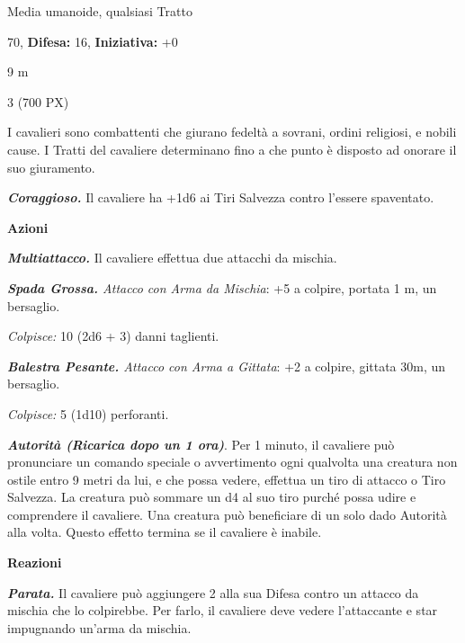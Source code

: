 \begin{multicols}{2}
{
\begin{description}[noitemsep, topsep=0pt, parsep=0pt, partopsep=0pt, leftmargin=0cm, labelwidth=2.2cm]
    \item[\textbf{Taglia/Tipo:}] Media umanoide, qualsiasi Tratto
    \item[\textbf{Caratt.:}] 
    \item[\textbf{Punti Ferita:}] 70,  \textbf{Difesa:} 16,  \textbf{Iniziativa:} +0
    \item[\textbf{Tiri Salvez.:}] 
    \item[\textbf{Movimento:}] 9 m
    \item[\textbf{Sfida:}] 3 (700 PX)\smallskip
\end{description}

I cavalieri sono combattenti che giurano fedeltà a sovrani, ordini religiosi, e nobili cause. I Tratti del cavaliere determinano fino a che punto è disposto ad onorare il suo giuramento.

\emph{\textbf{Coraggioso.}} Il cavaliere ha +1d6 ai Tiri Salvezza contro l'essere spaventato.

\textbf{Azioni}

\emph{\textbf{Multiattacco.}} Il cavaliere effettua due attacchi da mischia.

\emph{\textbf{Spada Grossa.} Attacco con Arma da Mischia}: +5 a colpire, portata 1 m, un bersaglio.

\emph{Colpisce:} 10 (2d6 + 3) danni taglienti.

\emph{\textbf{Balestra Pesante.} Attacco con Arma a Gittata}: +2 a colpire, gittata 30m, un bersaglio.

\emph{Colpisce:} 5 (1d10) perforanti.

\emph{\textbf{Autorità (Ricarica dopo un 1 ora)}}. Per 1 minuto, il cavaliere può pronunciare un comando speciale o avvertimento ogni qualvolta una creatura non ostile entro 9 metri da lui, e che possa vedere, effettua un tiro di attacco o Tiro Salvezza. La creatura può sommare un d4 al suo tiro purché possa udire e comprendere il cavaliere. Una creatura può beneficiare di un solo dado Autorità alla volta. Questo effetto termina se il cavaliere è inabile.

\textbf{Reazioni}

\emph{\textbf{Parata.}} Il cavaliere può aggiungere 2 alla sua Difesa contro un attacco da mischia che lo colpirebbe. Per farlo, il cavaliere deve vedere l'attaccante e star impugnando un'arma da mischia.

}
\end{multicols}
